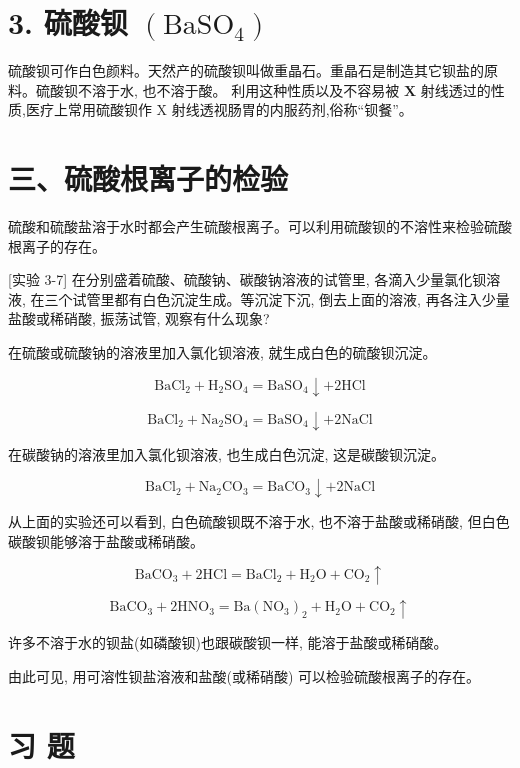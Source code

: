 \documentclass[10pt]{article}
\begin{document}
\section*{3. 硫酸钡 \(\left( {\mathrm{{BaSO}}}_{4}\right)\)}

硫酸钡可作白色颜料。天然产的硫酸钡叫做重晶石。重晶石是制造其它钡盐的原料。硫酸钡不溶于水, 也不溶于酸。 利用这种性质以及不容易被 \(\mathbf{X}\) 射线透过的性质,医疗上常用硫酸钡作 \(\mathrm{X}\) 射线透视肠胃的内服药剂,俗称“钡餐”。

\section*{三、硫酸根离子的检验}

硫酸和硫酸盐溶于水时都会产生硫酸根离子。可以利用硫酸钡的不溶性来检验硫酸根离子的存在。

[实验 3-7] 在分别盛着硫酸、硫酸钠、碳酸钠溶液的试管里, 各滴入少量氯化钡溶液, 在三个试管里都有白色沉淀生成。等沉淀下沉, 倒去上面的溶液, 再各注入少量盐酸或稀硝酸, 振荡试管, 观察有什么现象?

在硫酸或硫酸钠的溶液里加入氯化钡溶液, 就生成白色的硫酸钡沉淀。

\[
{\mathrm{{BaCl}}}_{2} + {\mathrm{H}}_{2}{\mathrm{{SO}}}_{4} = {\mathrm{{BaSO}}}_{4} \downarrow + 2\mathrm{{HCl}}
\]

\[
{\mathrm{{BaCl}}}_{2} + {\mathrm{{Na}}}_{2}{\mathrm{{SO}}}_{4} = {\mathrm{{BaSO}}}_{4} \downarrow + 2\mathrm{{NaCl}}
\]

在碳酸钠的溶液里加入氯化钡溶液, 也生成白色沉淀, 这是碳酸钡沉淀。

\[
{\mathrm{{BaCl}}}_{2} + {\mathrm{{Na}}}_{2}{\mathrm{{CO}}}_{3} = {\mathrm{{BaCO}}}_{3} \downarrow + 2\mathrm{{NaCl}}
\]

从上面的实验还可以看到, 白色硫酸钡既不溶于水, 也不溶于盐酸或稀硝酸, 但白色碳酸钡能够溶于盐酸或稀硝酸。

\[
{\mathrm{{BaCO}}}_{3} + 2\mathrm{{HCl}} = {\mathrm{{BaCl}}}_{2} + {\mathrm{H}}_{2}\mathrm{O} + {\mathrm{{CO}}}_{2} \uparrow
\]

\[
{\mathrm{{BaCO}}}_{3} + 2{\mathrm{{HNO}}}_{3} = \mathrm{{Ba}}{\left( {\mathrm{{NO}}}_{3}\right) }_{2} + {\mathrm{H}}_{2}\mathrm{O} + {\mathrm{{CO}}}_{2} \uparrow
\]

许多不溶于水的钡盐(如磷酸钡)也跟碳酸钡一样, 能溶于盐酸或稀硝酸。

由此可见, 用可溶性钡盐溶液和盐酸(或稀硝酸) 可以检验硫酸根离子的存在。

\section*{习 题}
\end{document}
